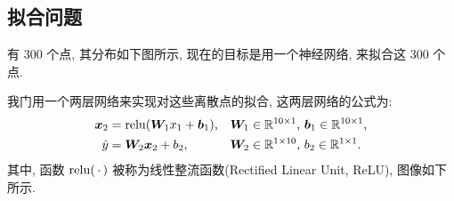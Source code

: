 \subsection{拟合问题}
\begin{frame}{\insertsection}{\insertsubsection}
\begin{minipage}[t]{0.41\textwidth}
有 $300$ 个点, 其分布如下图所示, 现在的目标是用一个神经网络, 来拟合这 $300$ 个点.

\begin{center}
\hspace{-10pt}%
\end{center}
\end{minipage}%
\hfill\pause%
\begin{minipage}[t]{0.55\textwidth}
我门用一个两层网络来实现对这些离散点的拟合, 这两层网络的公式为:%
%
\begin{align*}
\bm{x}_2 &= \operatorname{relu}(\bm{W}_1x_1 + \bm{b}_1)\text{,} && \text{$\bm{W}_1\in\mathbb{R}^{10\times1}$, $\bm{b}_1\in\mathbb{R}^{10\times1}$,}\\
\hat{y} &= \bm{W}_2\bm{x}_2 + b_2\text{,}  && \text{$\bm{W}_2\in\mathbb{R}^{1\times10}$, $b_2\in\mathbb{R}^{1\times1}$.}
\end{align*}\pause%
其中, 函数 $\operatorname{relu}(\,\cdot\,)$ 被称为线性整流函数(Rectified Linear Unit, ReLU), 图像如下所示.\vspace{-2pt}

\begin{center}
\hspace{-10pt}%
\end{center}
\end{minipage}
\end{frame}


